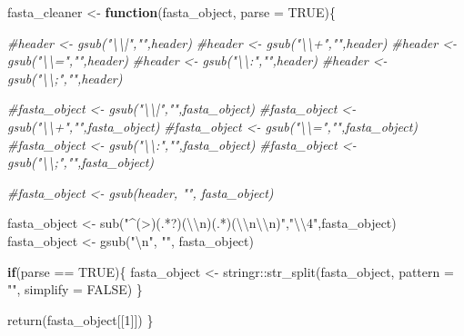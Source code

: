 \documentclass[
]{book}
\newenvironment{Shaded}{\begin{snugshade}}{\end{snugshade}}
\newcommand{\AttributeTok}[1]{\textcolor[rgb]{0.77,0.63,0.00}{#1}}
\newcommand{\CommentTok}[1]{\textcolor[rgb]{0.56,0.35,0.01}{\textit{#1}}}
\newcommand{\ConstantTok}[1]{\textcolor[rgb]{0.00,0.00,0.00}{#1}}
\newcommand{\ControlFlowTok}[1]{\textcolor[rgb]{0.13,0.29,0.53}{\textbf{#1}}}
\newcommand{\DecValTok}[1]{\textcolor[rgb]{0.00,0.00,0.81}{#1}}
\newcommand{\FunctionTok}[1]{\textcolor[rgb]{0.00,0.00,0.00}{#1}}
\newcommand{\NormalTok}[1]{#1}
\newcommand{\OtherTok}[1]{\textcolor[rgb]{0.56,0.35,0.01}{#1}}
\newcommand{\SpecialCharTok}[1]{\textcolor[rgb]{0.00,0.00,0.00}{#1}}
\newcommand{\StringTok}[1]{\textcolor[rgb]{0.31,0.60,0.02}{#1}}
\begin{document}
\begin{Shaded}
\begin{Highlighting}[]
\NormalTok{fasta\_cleaner }\OtherTok{\textless{}{-}} \ControlFlowTok{function}\NormalTok{(fasta\_object, }\AttributeTok{parse =} \ConstantTok{TRUE}\NormalTok{)\{}

         \CommentTok{\#header \textless{}{-} gsub("\textbackslash{}\textbackslash{}|","",header)}
         \CommentTok{\#header \textless{}{-} gsub("\textbackslash{}\textbackslash{}+","",header)}
         \CommentTok{\#header \textless{}{-} gsub("\textbackslash{}\textbackslash{}=","",header)}
         \CommentTok{\#header \textless{}{-} gsub("\textbackslash{}\textbackslash{}:","",header)}
         \CommentTok{\#header \textless{}{-} gsub("\textbackslash{}\textbackslash{};","",header)}

         \CommentTok{\#fasta\_object \textless{}{-} gsub("\textbackslash{}\textbackslash{}|","",fasta\_object)}
         \CommentTok{\#fasta\_object \textless{}{-} gsub("\textbackslash{}\textbackslash{}+","",fasta\_object)}
         \CommentTok{\#fasta\_object \textless{}{-} gsub("\textbackslash{}\textbackslash{}=","",fasta\_object)}
         \CommentTok{\#fasta\_object \textless{}{-} gsub("\textbackslash{}\textbackslash{}:","",fasta\_object)}
         \CommentTok{\#fasta\_object \textless{}{-} gsub("\textbackslash{}\textbackslash{};","",fasta\_object)}

         \CommentTok{\#fasta\_object \textless{}{-} gsub(header, "", fasta\_object)}

\NormalTok{        fasta\_object }\OtherTok{\textless{}{-}} \FunctionTok{sub}\NormalTok{(}\StringTok{"\^{}(\textgreater{})(.*?)(}\SpecialCharTok{\textbackslash{}\textbackslash{}}\StringTok{n)(.*)(}\SpecialCharTok{\textbackslash{}\textbackslash{}}\StringTok{n}\SpecialCharTok{\textbackslash{}\textbackslash{}}\StringTok{n)"}\NormalTok{,}\StringTok{"}\SpecialCharTok{\textbackslash{}\textbackslash{}}\StringTok{4"}\NormalTok{,fasta\_object)}
\NormalTok{        fasta\_object }\OtherTok{\textless{}{-}} \FunctionTok{gsub}\NormalTok{(}\StringTok{"}\SpecialCharTok{\textbackslash{}n}\StringTok{"}\NormalTok{, }\StringTok{""}\NormalTok{, fasta\_object)}

         \ControlFlowTok{if}\NormalTok{(parse }\SpecialCharTok{==} \ConstantTok{TRUE}\NormalTok{)\{}
\NormalTok{         fasta\_object }\OtherTok{\textless{}{-}}\NormalTok{ stringr}\SpecialCharTok{::}\FunctionTok{str\_split}\NormalTok{(fasta\_object,}
                                   \AttributeTok{pattern =} \StringTok{""}\NormalTok{,}
                                   \AttributeTok{simplify =} \ConstantTok{FALSE}\NormalTok{)}
\NormalTok{         \}}

         \FunctionTok{return}\NormalTok{(fasta\_object[[}\DecValTok{1}\NormalTok{]])}
\NormalTok{ \}}
\end{Highlighting}
\end{Shaded}
\end{document}
